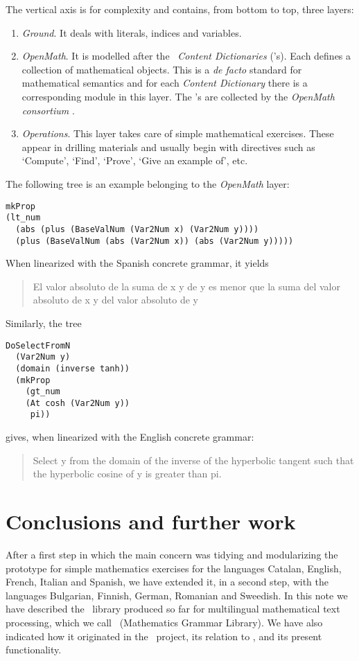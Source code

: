 \documentclass[adraft,copyright,creativecommons]{eptcs}
\begin{document}
The vertical axis is for complexity and contains, from bottom to top, three
layers:

\begin{enumerate}
	\item\emph{Ground}. It deals with literals, indices and variables.
	\item\emph{OpenMath}. It is modelled after the \openmath\ \emph{Content
Dictionaries} (\CD's). Each \CD{} defines a collection of
mathematical objects. This is a \emph{de facto} standard for mathematical
semantics and for each \emph{Content Dictionary}
there is a corresponding module in this layer.
The \CD's are collected by the
\emph{OpenMath consortium} \cite{OpenMath}.
	\item\emph{Operations}.
This layer takes care of simple mathematical exercises. These appear
in drilling materials and usually begin with directives such as
`Compute', `Find', `Prove', `Give an example of', etc.
\end{enumerate}

The following tree is an example belonging to the \emph{OpenMath} layer:
\begin{lstlisting}
mkProp
(lt_num
  (abs (plus (BaseValNum (Var2Num x) (Var2Num y))))
  (plus (BaseValNum (abs (Var2Num x)) (abs (Var2Num y)))))
\end{lstlisting}
When linearized with the Spanish concrete grammar, it yields
\begin{quote}
El valor absoluto de la suma  de x y de y es menor que la suma del valor
absoluto  de x y del valor absoluto de y
\end{quote}
\noindent Similarly, the tree
\begin{lstlisting}
DoSelectFromN
  (Var2Num y)
  (domain (inverse tanh))
  (mkProp
    (gt_num
    (At cosh (Var2Num y))
     pi))
\end{lstlisting}
gives, when linearized with the English concrete grammar:
\begin{quote}
Select y from the domain of the inverse of the hyperbolic tangent such that
the hyperbolic cosine of y is greater than pi.
\end{quote}


\section{Conclusions and further work} %
\label{sec:conclusions}

After a first step in which the main concern was tidying and modularizing
the \webalt{} prototype for simple mathematics exercises for the languages
Catalan,
English,
French,
Italian and
Spanish,
we have extended it, in a second step, with the languages
Bulgarian, Finnish,
German, Romanian and Sweedish.
In this note we have described the \GF\ library produced so far for
multilingual mathematical text processing, which we call
\MGL\ (Mathematics Grammar Library). We have also indicated how it
originated in the \webalt\ project, its relation to \GF, and its
present functionality.
\end{document}
